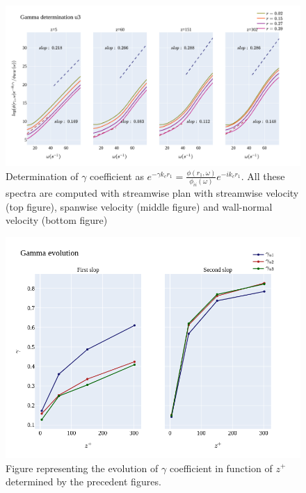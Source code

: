 \documentclass[]{article}
\theoremstyle{plain}
\theoremstyle{remark}
\begin{document}
\begin{figure}[h!]
	\begin{center}
		\includegraphics[width=\textwidth]{../output/split_time/gamma/gamma_u3.png}
		\caption{Determination of $\gamma$ coefficient as $e^{-\gamma k_c r_1} = \frac{\phi(r_1,\omega)}{\phi_{ii}(\omega)}e^{-ik_cr_1}$. All these spectra are computed with streamwise plan with streamwise velocity (top figure), spanwise velocity (middle figure) and wall-normal velocity (bottom figure)}
	\end{center}
\end{figure}

\begin{figure}[h!]
	\begin{center}
		\includegraphics[width=\textwidth]{../output/split_time/gamma/gamma_view.png}
		\caption{Figure representing the evolution of $\gamma$ coefficient in function of $z^+$ determined by the precedent figures. }
	\end{center}
\end{figure}
	
	
\end{document}

